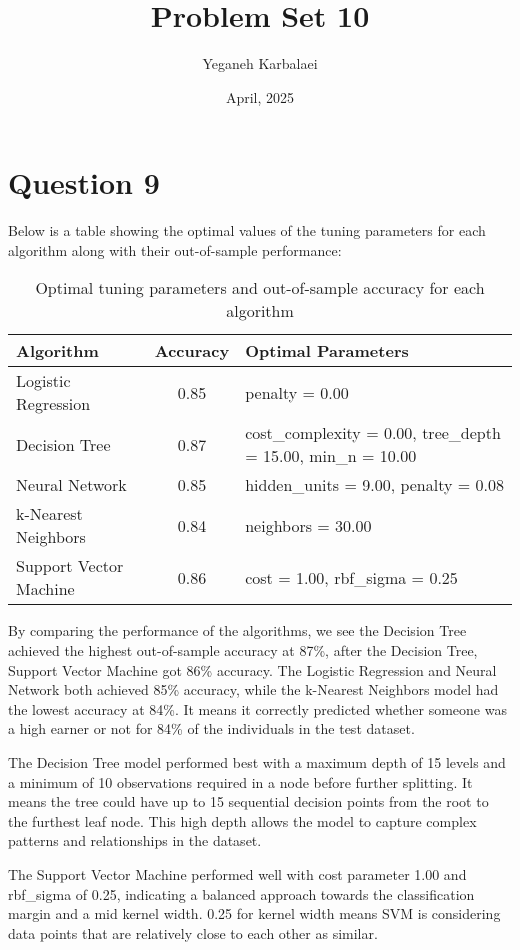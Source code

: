\documentclass{article}
\begin{document}
\title{Problem Set 10}
\author{Yeganeh Karbalaei}
\date{April, 2025}

\maketitle

\section{Question 9}
Below is a table showing the optimal values of the tuning parameters for each algorithm along with their out-of-sample performance:

\begin{table}[h]
\centering
\begin{tabular}{|l|c|l|}
\hline
\textbf{Algorithm} & \textbf{Accuracy} & \textbf{Optimal Parameters} \\
\hline
Logistic Regression & 0.85 & penalty = 0.00 \\
\hline
Decision Tree & 0.87 & cost\_complexity = 0.00, tree\_depth = 15.00, min\_n = 10.00 \\
\hline
Neural Network & 0.85 & hidden\_units = 9.00, penalty = 0.08 \\
\hline
k-Nearest Neighbors & 0.84 & neighbors = 30.00 \\
\hline
Support Vector Machine & 0.86 & cost = 1.00, rbf\_sigma = 0.25 \\
\hline
\end{tabular}
\caption{Optimal tuning parameters and out-of-sample accuracy for each algorithm}
\label{tab:results}
\end{table}

By comparing the performance of the algorithms, we see the Decision Tree achieved the highest out-of-sample accuracy at 87\%, after the Decision Tree, Support Vector Machine got 86\% accuracy. The Logistic Regression and Neural Network both achieved 85\% accuracy, while the k-Nearest Neighbors model had the lowest accuracy at 84\%. It means  it correctly predicted whether someone was a high earner or not for 84\% of the individuals in the test dataset.

The Decision Tree model performed best with a maximum depth of 15 levels and a minimum of 10 observations required in a node before further splitting. It means the tree could have up to 15 sequential decision points from the root to the furthest leaf node. This high depth allows the model to capture complex patterns and relationships in the dataset.

The Support Vector Machine performed well with cost parameter 1.00 and rbf\_sigma of 0.25, indicating a balanced approach towards the classification margin and a mid kernel width. 0.25 for kernel width means  SVM is considering data points that are relatively close to each other as similar.
\end{document}
